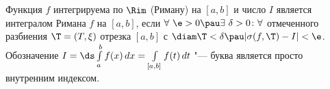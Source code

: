 
 	Функция $f$ интегрируема по $\Rim$ (Риману) на $[a,b]$ и число $I$ является интегралом Римана $f$ на $[a,b]$, если
 	$\forall\ \e>0\pau \exists\ \delta>0\colon\forall$ отмеченного разбиения  $\T=(T,\xi)$  отрезка $[a,b]$ с $\diam\T<\delta\pau |\sigma(f,\T)-I|<\e$.
 	Обозначение $I=\ds\int\limits_{a}^bf(x)\,dx=\int\limits_{[a,b]}f(t)\,dt$ "--- буква является просто внутренним индексом. 
 